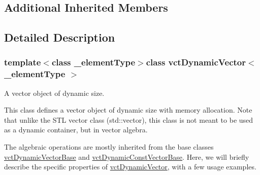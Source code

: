 \subsection*{Additional Inherited Members}


\subsection{Detailed Description}
\subsubsection*{template$<$class \+\_\+element\+Type$>$class vct\+Dynamic\+Vector$<$ \+\_\+element\+Type $>$}

A vector object of dynamic size. 

This class defines a vector object of dynamic size with memory allocation. Note that unlike the S\+T\+L vector class (std\+::vector), this class is not meant to be used as a dynamic container, but in vector algebra.

The algebraic operations are mostly inherited from the base classes \hyperlink{classvct_dynamic_vector_base}{vct\+Dynamic\+Vector\+Base} and \hyperlink{classvct_dynamic_const_vector_base}{vct\+Dynamic\+Const\+Vector\+Base}. Here, we will briefly describe the specific properties of \hyperlink{classvct_dynamic_vector}{vct\+Dynamic\+Vector}, with a few usage examples.


